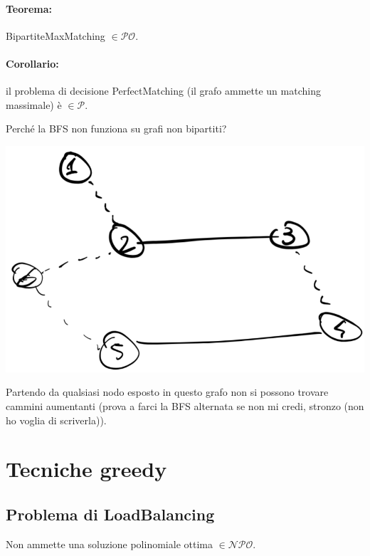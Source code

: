 \documentclass[11pt]{article}
\begin{document}
	\paragraph{Teorema:} BipartiteMaxMatching $\in \mathcal{PO}$.\\
	
	\paragraph{Corollario:} il problema di decisione PerfectMatching (il grafo ammette un matching massimale) è $\in \mathcal{P}$.\\
	
	\newpage
	
	Perché la BFS non funziona su grafi non bipartiti?
	\begin{center}
		\includegraphics[width=0.8\columnwidth]{img/bipartito1}
	\end{center}
	Partendo da qualsiasi nodo esposto in questo grafo non si possono trovare cammini aumentanti (prova a farci la BFS alternata se non mi credi, stronzo (non ho voglia di scriverla)).\\
	
	\newpage
	
	\section{Tecniche greedy}
	
	\subsection{Problema di LoadBalancing}
	Non ammette una soluzione polinomiale ottima $\in \mathcal{NPO}$.\\
	
\end{document}
